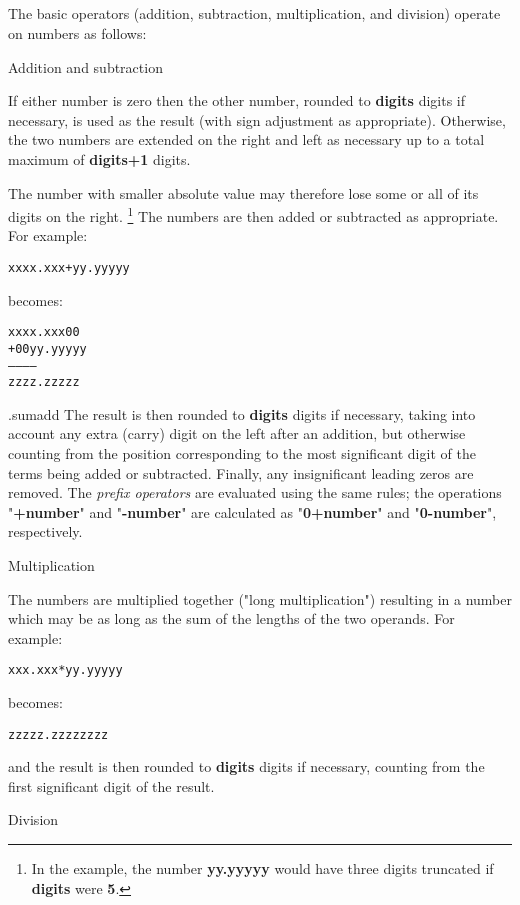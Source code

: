 \subsection{}\label{}
 The basic operators (addition, subtraction, multiplication, and
division) operate on numbers as follows:
\begin{description}
\item{Addition and subtraction}

If either number is zero then the other number, rounded
to \textbf{digits} digits if necessary, is used as the result (with
sign adjustment as appropriate).
Otherwise, the two numbers are extended on the right and left as
necessary up to a total maximum of \textbf{digits+1} digits.
 
The number with smaller absolute value may therefore lose some or
all of its digits on the right.
\footnote{
In the example, the number \textbf{yy.yyyyy} would have three digits
truncated if \textbf{digits} were \textbf{5}.
}
The numbers are then added or subtracted as appropriate.  For example:
\begin{alltt}
xxxx.xxx + yy.yyyyy
\end{alltt}
becomes:
\begin{alltt}
  xxxx.xxx00
+ 00yy.yyyyy
------------
  zzzz.zzzzz
\end{alltt}
.sumadd
The result is then rounded to \textbf{digits} digits if necessary,
taking into account any extra (carry) digit on the left after an
addition, but otherwise counting from the position corresponding to the
most significant digit of the terms being added or subtracted.
Finally, any insignificant leading zeros are removed.
 The \emph{prefix operators} are evaluated using the same rules;
the operations "\textbf{+number}" and "\textbf{-number}"
are calculated as "\textbf{0+number}" and
"\textbf{0-number}", respectively.
\item{Multiplication}

The numbers are multiplied together ("long multiplication")
resulting in a number which may be as long as the sum of the lengths of
the two operands.  For example:
\begin{alltt}
xxx.xxx * yy.yyyyy
\end{alltt}
becomes:
\begin{alltt}
zzzzz.zzzzzzzz
\end{alltt}
and the result is then rounded to \textbf{digits} digits if
necessary, counting from the first significant digit of the result.
\item{Division}
\index{,}


\end{description}
